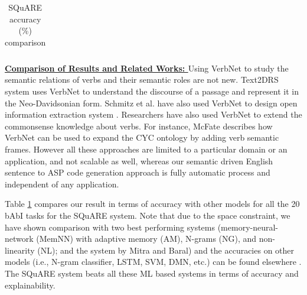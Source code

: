 \documentclass[letterpaper]{article}
\begin{document}
\begin{table}[b]
\begin{tabular}{|c||*{3}{c|}}
\end{tabular}

\vspace{-0.73mm}
\vspace{-1.47mm}
\vspace{-2.20mm}
\vspace{-2.93mm}
\caption{SQuARE accuracy (\%)  comparison}
\label{table:square_compare}
\end{table}



\noindent\textbf{\underline{Comparison of Results and Related Works: }}
Using VerbNet to study the semantic relations of verbs and their semantic roles are not new. Text2DRS system \cite{text_to_drs} uses VerbNet to understand the discourse of a passage and represent it in the Neo-Davidsonian form. Schmitz et al. have also used VerbNet to design open information extraction system \cite{vn_ie}. Researchers have also used VerbNet to extend the commonsense knowledge about verbs. For instance, McFate \cite{cyc_vn} describes how VerbNet can be used to expand the CYC ontology by adding verb semantic frames. However all these approaches are limited to a particular domain or an application, and not scalable as well, whereas our semantic driven English sentence to ASP code generation approach is fully automatic process and independent of any application.

Table \ref{table:square_compare} compares our result in terms of accuracy with other models for all the 20 bAbI tasks for the SQuARE system. Note that due to the space constraint, we have shown comparison with two best performing systems (memory-neural-network (MemNN) with adaptive memory (AM), N-grams (NG), and non-linearity (NL); and the system by Mitra and Baral) and the accuracies on other models (i.e., N-gram classifier, LSTM, SVM, DMN, etc.) can be found elsewhere \cite{babi,dmn}. The SQuARE system beats all these ML based systems in terms of accuracy and explainability.

\end{document}
